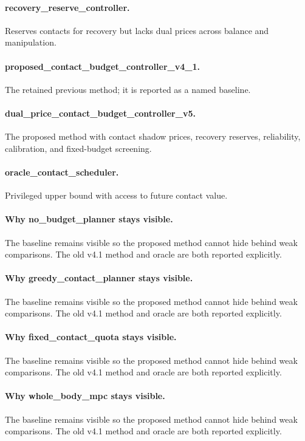 \documentclass{article}
\begin{document}
\paragraph{recovery\_reserve\_controller.} Reserves contacts for recovery but lacks dual prices across balance and manipulation.
\paragraph{proposed\_contact\_budget\_controller\_v4\_1.} The retained previous method; it is reported as a named baseline.
\paragraph{dual\_price\_contact\_budget\_controller\_v5.} The proposed method with contact shadow prices, recovery reserves, reliability, calibration, and fixed-budget screening.
\paragraph{oracle\_contact\_scheduler.} Privileged upper bound with access to future contact value.
\paragraph{Why no\_budget\_planner stays visible.} The baseline remains visible so the proposed method cannot hide behind weak comparisons. The old v4.1 method and oracle are both reported explicitly.
\paragraph{Why greedy\_contact\_planner stays visible.} The baseline remains visible so the proposed method cannot hide behind weak comparisons. The old v4.1 method and oracle are both reported explicitly.
\paragraph{Why fixed\_contact\_quota stays visible.} The baseline remains visible so the proposed method cannot hide behind weak comparisons. The old v4.1 method and oracle are both reported explicitly.
\paragraph{Why whole\_body\_mpc stays visible.} The baseline remains visible so the proposed method cannot hide behind weak comparisons. The old v4.1 method and oracle are both reported explicitly.
\end{document}
